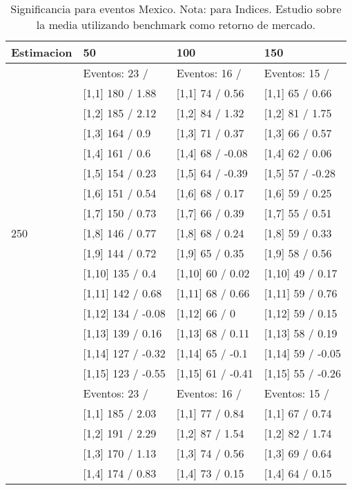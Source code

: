 \begin{table}

\caption{Significancia para eventos Mexico. Nota: para Indices. Estudio sobre la media utilizando benchmark como retorno de mercado.}
\centering
\begin{tabular}[t]{llll}
\toprule
Estimacion & 50 & 100 & 150\\
\midrule
 & Eventos:  23 / & Eventos:  16 / & Eventos:  15 /\\
 & {}[1,1] 180  / 1.88 & {}[1,1] 74  / 0.56 & {}[1,1] 65  / 0.66\\
 & {}[1,2] 185  / 2.12 & {}[1,2] 84  / 1.32 & {}[1,2] 81  / 1.75\\
 & {}[1,3] 164  / 0.9 & {}[1,3] 71  / 0.37 & {}[1,3] 66  / 0.57\\
 & {}[1,4] 161  / 0.6 & {}[1,4] 68  / -0.08 & {}[1,4] 62  / 0.06\\
\addlinespace
 & {}[1,5] 154  / 0.23 & {}[1,5] 64  / -0.39 & {}[1,5] 57  / -0.28\\
 & {}[1,6] 151  / 0.54 & {}[1,6] 68  / 0.17 & {}[1,6] 59  / 0.25\\
 & {}[1,7] 150  / 0.73 & {}[1,7] 66  / 0.39 & {}[1,7] 55  / 0.51\\
250 & {}[1,8] 146  / 0.77 & {}[1,8] 68  / 0.24 & {}[1,8] 59  / 0.33\\
 & {}[1,9] 144  / 0.72 & {}[1,9] 65  / 0.35 & {}[1,9] 58  / 0.56\\
\addlinespace
 & {}[1,10] 135  / 0.4 & {}[1,10] 60  / 0.02 & {}[1,10] 49  / 0.17\\
 & {}[1,11] 142  / 0.68 & {}[1,11] 68  / 0.66 & {}[1,11] 59  / 0.76\\
 & {}[1,12] 134  / -0.08 & {}[1,12] 66  / 0 & {}[1,12] 59  / 0.15\\
 & {}[1,13] 139  / 0.16 & {}[1,13] 68  / 0.11 & {}[1,13] 58  / 0.19\\
 & {}[1,14] 127  / -0.32 & {}[1,14] 65  / -0.1 & {}[1,14] 59  / -0.05\\
\addlinespace
 & {}[1,15] 123  / -0.55 & {}[1,15] 61  / -0.41 & {}[1,15] 55  / -0.26\\
 & Eventos:  23 / & Eventos:  16 / & Eventos:  15 /\\
 & {}[1,1] 185  / 2.03 & {}[1,1] 77  / 0.84 & {}[1,1] 67  / 0.74\\
 & {}[1,2] 191  / 2.29 & {}[1,2] 87  / 1.54 & {}[1,2] 82  / 1.74\\
 & {}[1,3] 170  / 1.13 & {}[1,3] 74  / 0.56 & {}[1,3] 69  / 0.64\\
\addlinespace
 & {}[1,4] 174  / 0.83 & {}[1,4] 73  / 0.15 & {}[1,4] 64  / 0.15\\

\end{tabular}
\end{table}
